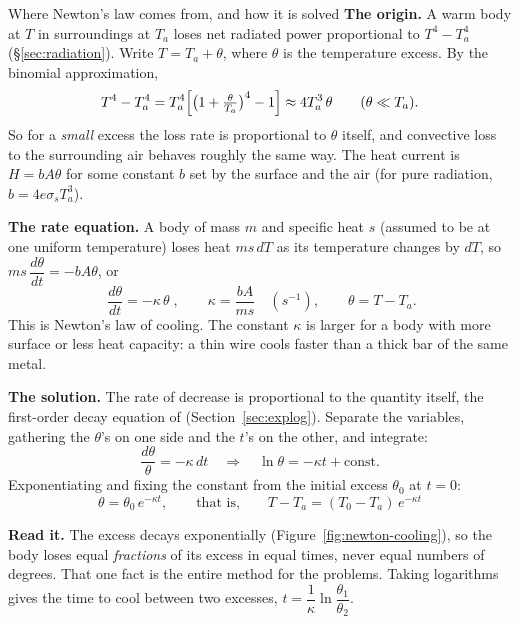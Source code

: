 \begin{derivbox}{Where Newton's law comes from, and how it is solved}
 \textbf{The origin.} A warm body at $T$ in surroundings at $T_a$ loses net radiated power
proportional to $T^4 - T_a^4$ (\S\ref{sec:radiation}). Write $T = T_a + \theta$, where $\theta$ is the
temperature excess. By the binomial approximation,
\[
T^4 - T_a^4 = T_a^4\Bigl[\bigl(1+\tfrac{\theta}{T_a}\bigr)^4 - 1\Bigr] \approx 4T_a^3\,\theta
\qquad(\theta \ll T_a).
\]
So for a \emph{small} excess the loss rate is proportional to $\theta$ itself, and convective loss to
the surrounding air behaves roughly the same way. The heat current is $H=bA\theta$ for some constant $b$
set by the surface and the air (for pure radiation, $b=4e\sigma_{\!s}T_a^3$).

 \textbf{The rate equation.} A body of mass $m$ and specific heat $s$ (assumed to be at one
uniform temperature) loses heat $ms\,dT$ as its temperature changes by $dT$, so $ms\,\dfrac{d\theta}{dt}
= -bA\theta$, or
\[
\boxed{\;\frac{d\theta}{dt} = -\kappa\,\theta\;}, \qquad \kappa=\frac{bA}{ms}\quad(\si{s^{-1}}),
\qquad \theta = T - T_a .
\]
This is Newton's law of cooling. The constant $\kappa$ is larger for a body with more surface or less
heat capacity: a thin wire cools faster than a thick bar of the same metal.

 \textbf{The solution.} The rate of decrease is proportional to the quantity itself, the
first-order decay equation of  (Section~\ref{sec:explog}). Separate the variables,
gathering the $\theta$'s on one side and the $t$'s on the other, and integrate:
\[
\frac{d\theta}{\theta} = -\kappa\,dt
\quad\Longrightarrow\quad
\ln\theta = -\kappa t + \text{const}.
\]
Exponentiating and fixing the constant from the initial excess $\theta_0$ at $t=0$:
\[
\boxed{\;\theta = \theta_0\,e^{-\kappa t}, \qquad\text{that is,}\qquad T - T_a = (T_0 - T_a)\,e^{-\kappa t}\;}
\]

 \textbf{Read it.} The excess decays exponentially (Figure~\ref{fig:newton-cooling}), so the
body loses equal \emph{fractions} of its excess in equal times, never equal numbers of degrees. That one
fact is the entire method for the problems. Taking logarithms gives the time to cool between two
excesses, $t=\dfrac1\kappa\ln\dfrac{\theta_1}{\theta_2}$.
\end{derivbox}

\begin{figure}[htbp]
\centering
{}
\end{figure}

